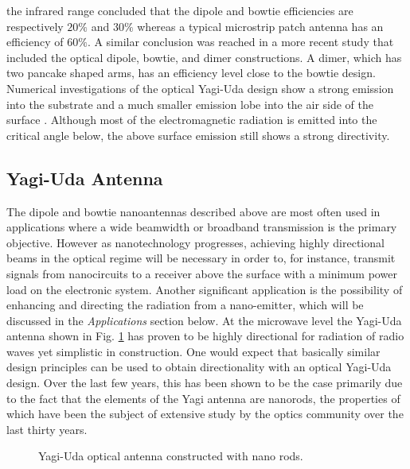 \documentclass[11pt]{article}
\begin{document}
the infrared range \cite{Fischer2008} concluded that the dipole and bowtie efficiencies are respectively $20 \%$ and $ 30 \%$ whereas a typical microstrip patch antenna has an efficiency of $60 \%$. A similar conclusion was reached in a more recent study \cite{9781107014145} that included the optical dipole, bowtie, and dimer constructions. A dimer, which has two pancake shaped arms, has an efficiency level close to the bowtie design. Numerical investigations of the optical Yagi-Uda design show a strong emission into the substrate and a much smaller emission lobe into the air side of the surface \cite{Hofmann2007} \cite{Kosako2010}. Although most of the electromagnetic radiation is emitted into the critical angle below, the above surface emission still shows a strong directivity.
\subsection{Yagi-Uda Antenna}
%
The dipole and bowtie nanoantennas described above are most often used in applications where a wide beamwidth or broadband transmission is the primary objective. However as nanotechnology progresses, achieving highly directional beams in the optical regime will be necessary in order to, for instance, transmit signals from nanocircuits to a receiver above the surface with a minimum power load on the electronic system. Another significant application is the possibility of enhancing and directing the radiation from a nano-emitter, which will be discussed in the \emph{Applications} section below. At the microwave level the Yagi-Uda antenna shown in Fig. \ref{fig:yagi_uda} has proven to be highly directional for radiation of radio waves yet simplistic in construction. One would expect that basically similar design principles can be used to obtain directionality with an optical Yagi-Uda design. Over the last few years, this has been shown to be the case primarily due to the fact that the elements of the Yagi antenna are nanorods, the properties of which have been the subject of extensive study by the optics community over the last thirty years.
%
%
\begin{figure}[h!]
  \centering
  \def\svgwidth{.75\linewidth}
  
  \caption{Yagi-Uda optical antenna constructed with nano rods.}
  \label{fig:yagi_uda}
\end{figure}
%
%
\end{document}
